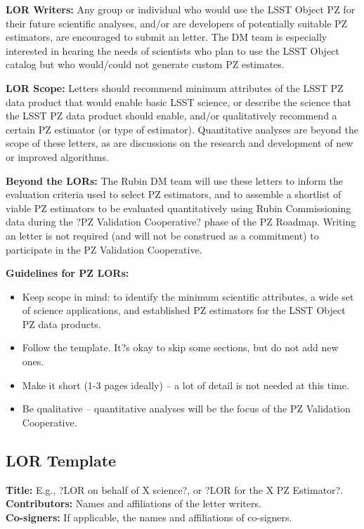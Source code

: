 \documentclass[DM,authoryear,toc]{lsstdoc}
\begin{document}
\textbf{LOR Writers:}
Any group or individual who would use the LSST Object PZ for their future scientific analyses, and/or are developers of potentially suitable PZ estimators, are encouraged to submit an letter.
The DM team is especially interested in hearing the needs of scientists who plan to use the LSST Object catalog but who would/could not generate custom PZ estimates.

\textbf{LOR Scope:}
Letters should recommend minimum attributes of the LSST PZ data product that would enable basic LSST science, or describe the science that the LSST PZ data product should enable, and/or qualitatively recommend a certain PZ estimator (or type of estimator).
Quantitative analyses are beyond the scope of these letters, as are discussions on the research and development of new or improved algorithms.

\textbf{Beyond the LORs:}
The Rubin DM team will use these letters to inform the evaluation criteria used to select PZ estimators, and to assemble a shortlist of viable PZ estimators to be evaluated quantitatively using Rubin Commissioning data during the ?PZ Validation Cooperative? phase of the PZ Roadmap.
Writing an letter is not required (and will not be construed as a commitment) to participate in the PZ Validation Cooperative. 

\textbf{Guidelines for PZ LORs:}
\begin{itemize}
\item Keep scope in mind: to identify the minimum scientific attributes, a wide set of science applications, and established PZ estimators for the LSST Object PZ data products.
\item Follow the template. It?s okay to skip some sections, but do not add new ones.
\item Make it short (1-3 pages ideally) -- a lot of detail is not needed at this time.
\item Be qualitative -- quantitative analyses will be the focus of the PZ Validation Cooperative.
\end{itemize}

\subsection{LOR Template}

\textbf{Title:} E.g., ?LOR on behalf of X science?, or ?LOR for the X PZ Estimator?. \\
\textbf{Contributors:} Names and affiliations of the letter writers. \\
\textbf{Co-signers:} If applicable, the names and affiliations of co-signers.
\end{document}
